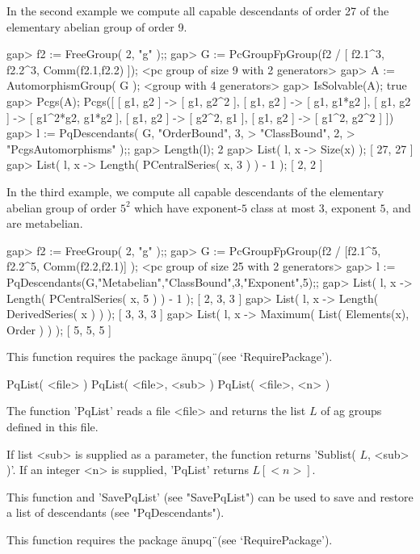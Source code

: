 In the second example we compute all  capable descendants of order  27 of
the  elementary abelian group of order 9.  

\beginexample
    gap> f2 := FreeGroup( 2, "g" );;                                       
    gap> G := PcGroupFpGroup(f2 / [ f2.1^3, f2.2^3, Comm(f2.1,f2.2) ]);
    <pc group of size 9 with 2 generators>
    gap> A := AutomorphismGroup( G );
    <group with 4 generators>
    gap> IsSolvable(A);                                       
    true
    gap> Pcgs(A);
    Pcgs([ [ g1, g2 ] -> [ g1, g2^2 ], [ g1, g2 ] -> [ g1, g1*g2 ], 
      [ g1, g2 ] -> [ g1^2*g2, g1*g2 ], [ g1, g2 ] -> [ g2^2, g1 ], 
      [ g1, g2 ] -> [ g1^2, g2^2 ] ])
    gap>  l := PqDescendants( G, "OrderBound", 3,
    >                            "ClassBound", 2,
    >                            "PcgsAutomorphisms" );;
    gap>  Length(l);
    2
    gap> List( l, x -> Size(x) );
    [ 27, 27 ]
    gap> List( l, x -> Length( PCentralSeries( x, 3 ) ) - 1 );
    [ 2, 2 ]
\endexample

In  the  third  example,  we  compute  all  capable  descendants  of  the
elementary abelian group of order  $5^2$ which have exponent-$5$ class at
most $3$, exponent $5$, and are metabelian.

\beginexample
    gap> f2 := FreeGroup( 2, "g" );;
    gap> G := PcGroupFpGroup(f2 /  [f2.1^5, f2.2^5, Comm(f2.2,f2.1)] );
    <pc group of size 25 with 2 generators>
    gap> l := PqDescendants(G,"Metabelian","ClassBound",3,"Exponent",5);;
    gap> List( l, x -> Length( PCentralSeries( x, 5 ) ) - 1 );
    [ 2, 3, 3 ]
    gap>  List( l, x -> Length( DerivedSeries( x ) ) );
    [ 3, 3, 3 ]
    gap> List( l, x -> Maximum( List( Elements(x), Order ) ) );  
    [ 5, 5, 5 ]
\endexample

This function requires the package \"anupq\"\ (see `RequirePackage').

\>PqList( <file> )
\>PqList( <file>, <sub> )
\>PqList( <file>, <n> )

The function 'PqList' reads a file  <file> and returns the list $L$ of ag
groups defined in this file.

If list <sub> is supplied as a parameter, the function  returns 'Sublist(
$L$, <sub> )'.  If an integer <n> is supplied, 'PqList' returns $L[<n>]$.

This  function  and  'SavePqList'  (see  "SavePqList")  can  be  used  to
save and restore a list of descendants (see "PqDescendants").

This function requires the package \"anupq\"\ (see `RequirePackage').

